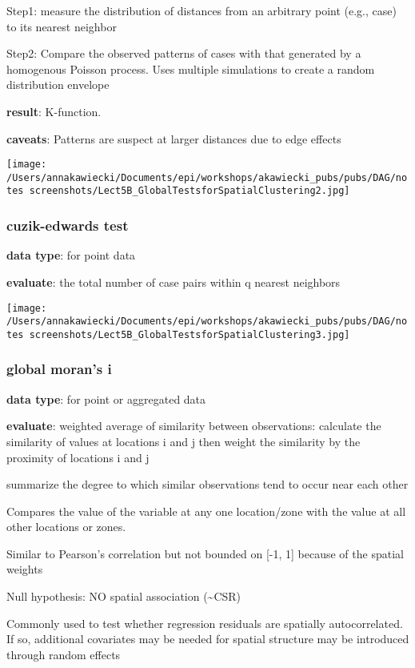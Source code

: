 \documentclass[
]{article}
\begin{document}
Step1: measure the distribution of distances from an arbitrary point
(e.g., case) to its nearest neighbor

Step2: Compare the observed patterns of cases with that generated by a
homogenous Poisson process. Uses multiple simulations to create a random
distribution envelope

\textbf{result}: K-function.

\textbf{caveats}: Patterns are suspect at larger distances due to edge
effects

\texttt{[image: /Users/annakawiecki/Documents/epi/workshops/akawiecki\_pubs/pubs/DAG/notes screenshots/Lect5B\_GlobalTestsforSpatialClustering2.jpg]}

\hypertarget{cuzik-edwards-test}{%
\subsubsection{cuzik-edwards test}\label{cuzik-edwards-test}}

\textbf{data type}: for point data

\textbf{evaluate}: the total number of case pairs within q nearest
neighbors

\texttt{[image: /Users/annakawiecki/Documents/epi/workshops/akawiecki\_pubs/pubs/DAG/notes screenshots/Lect5B\_GlobalTestsforSpatialClustering3.jpg]}

\hypertarget{global-morans-i}{%
\subsubsection{global moran's i}\label{global-morans-i}}

\textbf{data type}: for point or aggregated data

\textbf{evaluate}: weighted average of similarity between observations:
calculate the similarity of values at locations i and j then weight the
similarity by the proximity of locations i and j

summarize the degree to which similar observations tend to occur near
each other

Compares the value of the variable at any one location/zone with the
value at all other locations or zones.

Similar to Pearson's correlation but not bounded on {[}-1, 1{]} because
of the spatial weights

Null hypothesis: NO spatial association (\textasciitilde CSR)

Commonly used to test whether regression residuals are spatially
autocorrelated. If so, additional covariates may be needed for spatial
structure may be introduced through random effects
\end{document}
